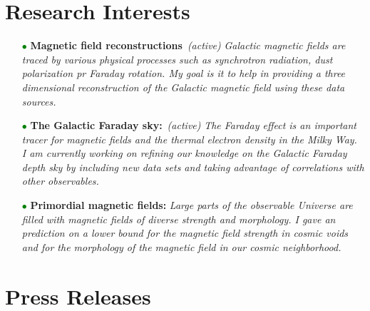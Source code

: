 \documentclass[11pt,a4paper,sans, table, dvipsnames]{moderncv}        %
\begin{document}
\vspace{\baselineskip}
\section{Research Interests}
\begin{itemize}

\item[\textcolor{Green}{$\bullet$}]{\textbf{Magnetic field reconstructions} \,\textit{(active)} \newline \textit{Galactic magnetic fields are traced by various physical processes such as synchrotron radiation, dust polarization pr Faraday rotation. My goal is it to help in providing a three dimensional reconstruction of the Galactic magnetic field using these data sources. }}

\vspace{3pt}

\item[\textcolor{Green}{$\bullet$}]{\textbf{The Galactic Faraday sky:} \,\textit{(active)}  \newline \textit{The Faraday effect is an important tracer for magnetic fields and the thermal electron density in the Milky Way. I am currently working on refining our knowledge on the Galactic Faraday depth sky by including new data sets and taking advantage of correlations with other observables.}}

\vspace{3pt}

\item[\textcolor{Green}{$\bullet$}]{\textbf{Primordial magnetic fields:}  \newline \textit{Large parts of the observable Universe are filled with magnetic fields of diverse strength and morphology. I gave an prediction on a lower bound for the magnetic field strength in cosmic voids and for the morphology of the magnetic field in our cosmic neighborhood. }}
\end{itemize}

\vspace{\baselineskip}
\section{Press Releases}
\end{document}
